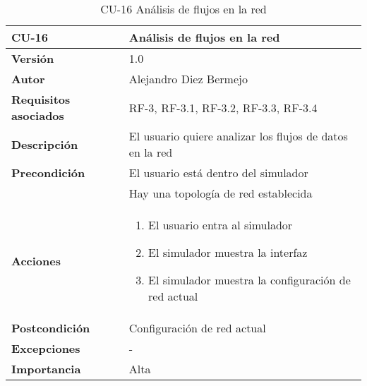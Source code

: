 \begin{table}[p]
	\centering
	\begin{tabularx}{\linewidth}{ p{} p{} }
		\toprule
		\textbf{CU-16}    & \textbf{Análisis de flujos en la red}\\
		\toprule
		\textbf{Versión}              & 1.0    \\
		\textbf{Autor}                & Alejandro Diez Bermejo \\
		\textbf{Requisitos asociados} & RF-3, RF-3.1, RF-3.2, RF-3.3, RF-3.4 \\
		\textbf{Descripción}          & El usuario quiere analizar los flujos de datos en la red \\
        \textbf{Precondición}         & El usuario está dentro del simulador \\
                                      & Hay una topología de red establecida \\
		\textbf{Acciones}             &
		\begin{enumerate}
			\def\labelenumi{\arabic{enumi}.}
			\tightlist
			\item El usuario entra al simulador
            \item El simulador muestra la interfaz
            \item El simulador muestra la configuración de red actual
		\end{enumerate}\\
		\textbf{Postcondición}        & Configuración de red actual \\
		\textbf{Excepciones}          & - \\
		\textbf{Importancia}          & Alta \\
		\bottomrule
	\end{tabularx}
	\caption{CU-16 Análisis de flujos en la red}
\end{table}

